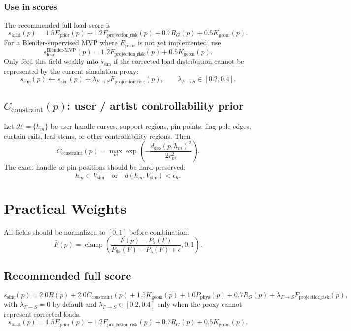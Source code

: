 \documentclass[11pt,a4paper]{article}
\newcommand{\clamp}{\operatorname{clamp}}
\begin{document}
\subsubsection{Use in scores}
The recommended full load-score is
\[
s_{\mathrm{load}}(p)=
1.5E_{\mathrm{prior}}(p)
+1.2F_{\mathrm{projection\_risk}}(p)
+0.7R_G(p)
+0.5K_{\mathrm{geom}}(p).
\]
For a Blender-supervised MVP where $E_{\mathrm{prior}}$ is not yet implemented, use
\[
s_{\mathrm{load}}^{\mathrm{Blender\text{-}MVP}}(p)=
1.2F_{\mathrm{projection\_risk}}(p)
+0.5K_{\mathrm{geom}}(p).
\]
Only feed this field weakly into $s_{\mathrm{sim}}$ if the corrected load distribution cannot be represented by the current simulation proxy:
\[
s_{\mathrm{sim}}(p)\leftarrow s_{\mathrm{sim}}(p)+\lambda_{F\rightarrow S}F_{\mathrm{projection\_risk}}(p),
\qquad \lambda_{F\rightarrow S}\in[0.2,0.4].
\]

\subsection{$C_{\mathrm{constraint}}(p)$: user / artist controllability prior}

Let $\mathcal{H}=\{h_m\}$ be user handle curves, support regions, pin points, flag-pole edges, curtain rails, leaf stems, or other controllability regions. Then
\[
C_{\mathrm{constraint}}(p)=
\max_m\exp\left(-\frac{d_{\mathrm{geo}}(p,h_m)^2}{2r_m^2}\right).
\]
The exact handle or pin positions should be hard-preserved:
\[
h_m\subset V_{\mathrm{sim}}\quad\text{or}\quad d(h_m,V_{\mathrm{sim}})<\epsilon_h.
\]

\section{Practical Weights}

All fields should be normalized to $[0,1]$ before combination:
\[
\widehat{F}(p)=
\clamp\left(\frac{F(p)-P_5(F)}{P_{95}(F)-P_5(F)+\epsilon},0,1\right).
\]

\subsection{Recommended full score}

\[
s_{\mathrm{sim}}(p)=
2.0B(p)+2.0C_{\mathrm{constraint}}(p)+1.5K_{\mathrm{geom}}(p)+1.0P_{\mathrm{phys}}(p)+0.7R_G(p)
+\lambda_{F\rightarrow S}F_{\mathrm{projection\_risk}}(p),
\]
with $\lambda_{F\rightarrow S}=0$ by default and $\lambda_{F\rightarrow S}\in[0.2,0.4]$ only when the proxy cannot represent corrected loads.
\[
s_{\mathrm{load}}(p)=
1.5E_{\mathrm{prior}}(p)+1.2F_{\mathrm{projection\_risk}}(p)+0.7R_G(p)+0.5K_{\mathrm{geom}}(p).
\]
\end{document}
